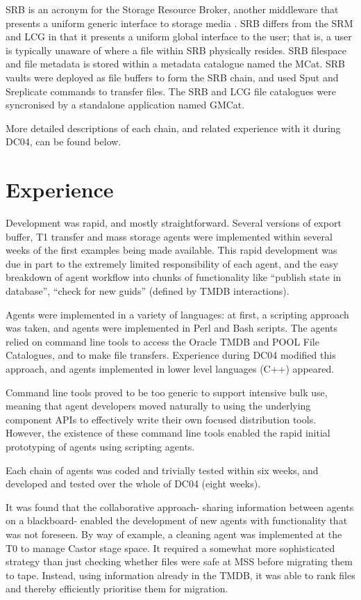 \documentclass{cmspaper}
\begin{document}
SRB is an acronym for the Storage Resource Broker, another middleware
that presents a uniform generic interface to storage media
\cite{srb}. SRB differs from the SRM and LCG in that it presents a
uniform global interface to the user; that is, a user is typically
unaware of where a file within SRB physically resides. SRB filespace
and file metadata is stored within a metadata catalogue named the
MCat. SRB vaults were deployed as file buffers to form the SRB chain,
and used Sput and Sreplicate commands to transfer files. The SRB and
LCG file catalogues were syncronised by a standalone application named
GMCat.

More detailed descriptions of each chain, and related experience with
it during DC04, can be found below.

\section{Experience}
Development was rapid, and mostly straightforward. Several versions of
export buffer, T1 transfer and mass storage agents were implemented
within several weeks of the first examples being made available. This
rapid development was due in part to the extremely limited
responsibility of each agent, and the easy breakdown of agent workflow
into chunks of functionality like ``publish state in database'',
``check for new guids'' (defined by TMDB interactions).

Agents were implemented in a variety of languages: at first, a
scripting approach was taken, and agents were implemented in Perl and
Bash scripts. The agents relied on command line tools to access the
Oracle TMDB and POOL File Catalogues, and to make file
transfers. Experience during DC04 modified this approach, and agents
implemented in lower level languages (C++) appeared.

Command line tools proved to be too generic to support intensive bulk
use, meaning that agent developers moved naturally to using the
underlying component APIs to effectively write their own focused
distribution tools. However, the existence of these command line tools
enabled the rapid initial prototyping of agents using scripting
agents.

Each chain of agents was coded and trivially tested within six weeks,
and developed and tested over the whole of DC04 (eight weeks).

It was found that the collaborative approach- sharing information
between agents on a blackboard- enabled the development of new agents
with functionality that was not foreseen. By way of example, a
cleaning agent was implemented at the T0 to manage Castor stage
space. It required a somewhat more sophisticated strategy than just
checking whether files were safe at MSS before migrating them to
tape. Instead, using information already in the TMDB, it was able to
rank files and thereby efficiently prioritise them for migration.
\end{document}
